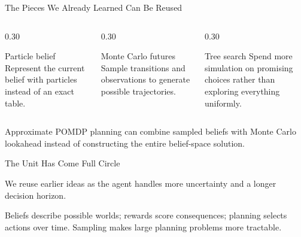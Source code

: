 \documentclass[aspectratio=169,10pt]{beamer}
\begin{document}
\begin{frame}[shrink=10]{The Pieces We Already Learned Can Be Reused}
  \begin{columns}[T,onlytextwidth]
    \begin{column}{0.30\textwidth}
      \begin{block}{Particle belief}
        Represent the current belief with particles instead of an exact table.
      \end{block}
    \end{column}
    \begin{column}{0.30\textwidth}
      \begin{block}{Monte Carlo futures}
        Sample transitions and observations to generate possible trajectories.
      \end{block}
    \end{column}
    \begin{column}{0.30\textwidth}
      \begin{block}{Tree search}
        Spend more simulation on promising choices rather than exploring everything uniformly.
      \end{block}
    \end{column}
  \end{columns}

  \begin{keyidea}
    Approximate POMDP planning can combine sampled beliefs with Monte Carlo lookahead instead of constructing the entire belief-space solution.
  \end{keyidea}
\end{frame}

\begin{frame}{The Unit Has Come Full Circle}
  \begin{center}
  \end{center}
  We reuse earlier ideas as the agent handles more uncertainty and a longer decision horizon.
  \begin{keyidea}
    Beliefs describe possible worlds; rewards score consequences; planning selects actions over time. Sampling makes large planning problems more tractable.
  \end{keyidea}
\end{frame}
\end{document}
